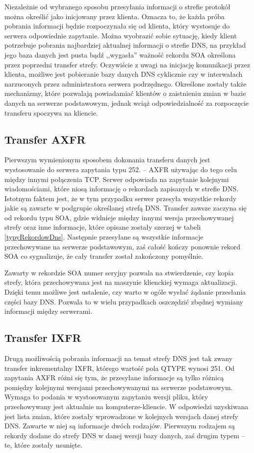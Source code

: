 Niezależnie od wybranego sposobu przesyłania informacji o strefie protokół można określić jako inicjowany przez klienta. Oznacza to,
że każda próba pobrania informacji będzie rozpoczynała się od klienta, który wystosuje do serwera odpowiednie zapytanie. Można
wyobrazić sobie sytuację, kiedy klient potrzebuje pobrania najbardziej aktualnej informacji o strefie DNS, na przykład jego baza
danych jest pusta bądź ,,wygasła'' ważność rekordu SOA określona przez poprzedni transfer strefy. Oczywiście z uwagi na inicjację
komunikacji przez klienta, możliwe jest pobieranie bazy danych DNS cyklicznie czy w interwałach narzuconych przez administratora
serwera podrzędnego. Określone zostały także mechanizmy, które pozwalają powiadamiać klientów o zaistnieniu zmian w bazie danych
na serwerze podstawowym\cite{RFC5936, RFC1996}, jednak wciąż odpowiedzialność za rozpoczęcie transferu spoczywa na kliencie.

\subsection{Transfer AXFR}
Pierwszym wymienionym sposobem dokonania transferu danych jest wystosowanie do serwera zapytania typu 252. -- AXFR\cite{RFC5936}
używając do tego celu między innymi połączenia TCP. Serwer odpowiada na zapytanie kolejnymi wiadomościami, które niosą informację o
rekordach zapisanych w strefie DNS. Istotnym faktem jest, że w tym przypadku serwer przesyła wszystkie rekordy jakie są zawarte w
podgrupie określanej strefą DNS. Transfer zawsze zaczyna się od rekordu typu SOA, gdzie widnieje między innymi wersja przechowywanej
strefy oraz inne informacje, które opisane zostały szerzej w tabeli \ref{typyRekordowDns}. Następnie przesyłane są wszystkie informacje
przechowywane na serwerze podstawowym, zaś całość kończy ponownie rekord SOA co sygnalizuje, że cały transfer został zakończony pomyślnie.

Zawarty w rekordzie SOA numer seryjny pozwala na stwierdzenie, czy kopia strefy, która przechowywana jest na maszynie klienckiej
wymaga aktualizacji. Dzięki temu możliwe jest ustalenie, czy warto w ogóle wysłać żądanie przesłania części bazy DNS. Pozwala to
w wielu przypadkach oszczędzić zbędnej wymiany informacji między serwerami.

\subsection{Transfer IXFR}
Drugą możliwością pobrania informacji na temat strefy DNS jest tak zwany transfer inkrementalny IXFR, którego wartość pola QTYPE
wynosi 251. Od zapytania AXFR różni się tym, że przesyłane informacje są tylko różnicą pomiędzy kolejnymi wersjami przechowywanymi
na serwerze podstawowym. Wymaga to podania w wystosowanym zapytaniu wersji pliku, który przechowywany jest aktualnie na
komputerze-kliencie. W odpowiedzi uzyskiwana jest lista zmian, które zostały wprowadzone w kolejnych wersjach danej strefy DNS.
Zawarte w niej są informacje dwóch rodzajów. Pierwszym rodzajem są rekordy dodane do strefy DNS w danej wersji bazy danych, zaś
drugim typem -- te, które zostały usunięte.

